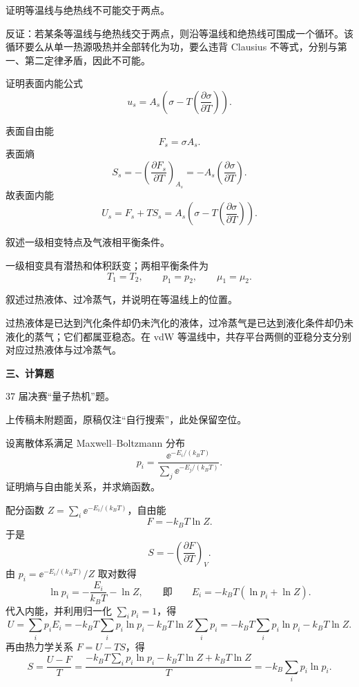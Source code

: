 \begin{question}
证明等温线与绝热线不可能交于两点。
\begin{solution}
反证：若某条等温线与绝热线交于两点，则沿等温线和绝热线可围成一个循环。该循环要么从单一热源吸热并全部转化为功，要么违背 Clausius 不等式，分别与第一、第二定律矛盾，因此不可能。

\end{solution}
\end{question}

\begin{question}
证明表面内能公式
\[
u_s=A_s\left(\sigma-T\left(\frac{\partial\sigma}{\partial T}\right)\right).
\]
\begin{solution}
表面自由能
\[
F_s=\sigma A_s.
\]
表面熵
\[
S_s=-\left(\frac{\partial F_s}{\partial T}\right)_{A_s}=-A_s\left(\frac{\partial\sigma}{\partial T}\right).
\]
故表面内能
\[
U_s=F_s+TS_s=A_s\left(\sigma-T\left(\frac{\partial\sigma}{\partial T}\right)\right).
\]
\end{solution}
\end{question}

\begin{question}
叙述一级相变特点及气液相平衡条件。
\begin{solution}
一级相变具有潜热和体积跃变；两相平衡条件为
\[
T_1=T_2,\qquad p_1=p_2,\qquad \mu_1=\mu_2.
\]
\end{solution}
\end{question}

\begin{question}
叙述过热液体、过冷蒸气，并说明在等温线上的位置。
\begin{solution}
过热液体是已达到汽化条件却仍未汽化的液体，过冷蒸气是已达到液化条件却仍未液化的蒸气；它们都属亚稳态。在 vdW 等温线中，共存平台两侧的亚稳分支分别对应过热液体与过冷蒸气。

\end{solution}
\end{question}

\textbf{三、计算题}
\begin{question}
37 届决赛“量子热机”题。
\begin{solution}
上传稿未附题面，原稿仅注“自行搜索”，此处保留空位。

\end{solution}
\end{question}

\begin{question}
设离散体系满足 Maxwell--Boltzmann 分布
\[
p_i=\frac{\ee^{-E_i/(k_BT)}}{\sum_j \ee^{-E_j/(k_BT)}}.
\]
证明熵与自由能关系，并求熵函数。
\begin{solution}
配分函数 $Z=\sum_i \ee^{-E_i/(k_BT)}$，自由能
\[
F=-k_BT\ln Z.
\]
于是
\[
S=-\left(\frac{\partial F}{\partial T}\right)_V.
\]
由 $p_i=\ee^{-E_i/(k_BT)}/Z$ 取对数得
\[
\ln p_i=-\frac{E_i}{k_BT}-\ln Z,
\qquad\text{即}\qquad
E_i=-k_BT\left(\ln p_i+\ln Z\right).
\]
代入内能，并利用归一化 $\sum_i p_i=1$，得
\[
U=\sum_i p_iE_i
=-k_BT\sum_i p_i\ln p_i-k_BT\ln Z\sum_i p_i
=-k_BT\sum_i p_i\ln p_i-k_BT\ln Z.
\]
再由热力学关系 $F=U-TS$，得
\[
S=\frac{U-F}{T}
=\frac{-k_BT\sum_i p_i\ln p_i-k_BT\ln Z+k_BT\ln Z}{T}
=-k_B\sum_i p_i\ln p_i.
\]
\end{solution}
\end{question}

